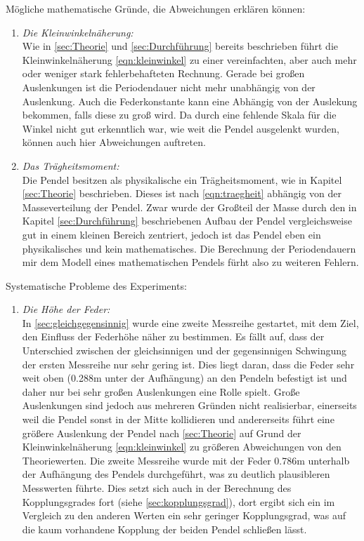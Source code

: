 Mögliche mathematische Gründe, die Abweichungen erklären können:
\begin{enumerate}
    \item \textit{Die Kleinwinkelnäherung:}\\
        Wie in \ref{sec:Theorie} und \ref{sec:Durchführung} bereits beschrieben führt die Kleinwinkelnäherung \eqref{eqn:kleinwinkel}
        zu einer vereinfachten, aber auch mehr oder weniger stark fehlerbehafteten Rechnung. Gerade bei großen Auslenkungen ist die
        Periodendauer nicht mehr unabhängig von der Auslenkung. Auch die Federkonstante kann eine Abhängig von
        der Auslekung bekommen, falls diese zu groß wird. Da durch eine fehlende Skala für die Winkel nicht gut erkenntlich war,
        wie weit die Pendel ausgelenkt wurden, können auch hier Abweichungen auftreten.
    \item \textit{Das Trägheitsmoment:}\\
        Die Pendel besitzen als physikalische ein Trägheitsmoment, wie in Kapitel \ref{sec:Theorie} beschrieben. Dieses ist nach
        \eqref{eqn:traegheit} abhängig von der Masseverteilung der Pendel. Zwar wurde der Großteil der Masse durch den in
        Kapitel \ref{sec:Durchführung} beschriebenen Aufbau der Pendel vergleichsweise gut in einem kleinen Bereich zentriert,
        jedoch ist das Pendel eben ein physikalisches und kein mathematisches. Die Berechnung der Periodendauern mir dem
        Modell eines mathematischen Pendels fürht also zu weiteren Fehlern.
\end{enumerate}
Systematische Probleme des Experiments:
\begin{enumerate}
    \item \textit{Die Höhe der Feder:} \\
    In \ref{sec:gleichgegensinnig} wurde eine zweite Messreihe gestartet, mit dem Ziel, den Einfluss der Federhöhe näher zu bestimmen.
    Es fällt auf, dass der Unterschied zwischen der gleichsinnigen und der gegensinnigen Schwingung der ersten Messreihe nur sehr gering ist.
    Dies liegt daran, dass die Feder sehr weit oben (0.288m unter der Aufhängung) an den Pendeln befestigt ist und daher nur bei sehr großen
    Auslenkungen eine Rolle spielt. Große Auslenkungen sind jedoch aus mehreren Gründen nicht realisierbar, einerseits weil die Pendel sonst
    in der Mitte kollidieren und andererseits führt eine größere Auslenkung der Pendel nach \ref{sec:Theorie} auf Grund der Kleinwinkelnäherung
    \eqref{eqn:kleinwinkel} zu größeren Abweichungen von den Theoriewerten. Die zweite Messreihe wurde mit der 
    Feder 0.786m unterhalb der Aufhängung des Pendels durchgeführt, was zu
    deutlich plausibleren Messwerten führte. Dies setzt sich auch in der Berechnung des Kopplungsgrades fort (siehe \ref{sec:kopplungsgrad}),
    dort ergibt sich ein im Vergleich zu den anderen Werten ein sehr geringer Kopplungsgrad, was auf die kaum vorhandene Kopplung der beiden Pendel schließen lässt.
\end{enumerate}
